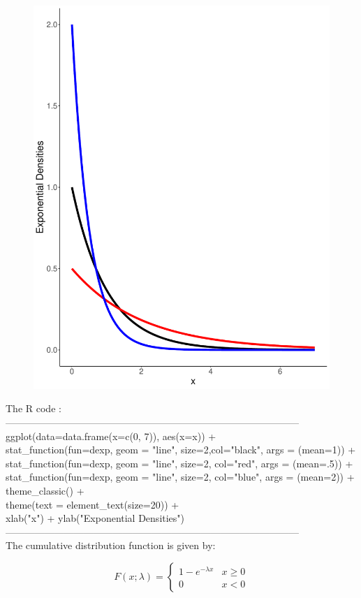 \documentclass{book} %
\begin{document}
\begin{figure}[H]
	\centering
	\includegraphics[width=0.7\linewidth,
	height=0.4\textheight]{exp_densities}
	\caption{}
	\label{fig:expdensities}
\end{figure}
\noindent The R code :\\
------------------------------------------------------------------------------------------\\
ggplot(data=data.frame(x=c(0, 7)), aes(x=x)) + \\
stat\_function(fun=dexp, geom = "line", size=2,col="black", args = (mean=1)) +\\
stat\_function(fun=dexp, geom = "line", size=2, col="red", args = (mean=.5)) +\\
stat\_function(fun=dexp, geom = "line", size=2, col="blue", args = (mean=2)) +\\
theme\_classic() +\\
theme(text = element\_text(size=20)) +\\
xlab("x") + ylab("Exponential Densities")\\
------------------------------------------------------------------------------------------\\
The cumulative distribution function is given by:\\
\begin{center}
	\begin{equation}
	F(x;\lambda)=
	\begin{cases}
	1- e^{-\lambda x}& \text{$x\geq $0}\\
	0& \text{$x < $0}
	\end{cases}
	\end{equation} 
\end{center}
\end{document}
